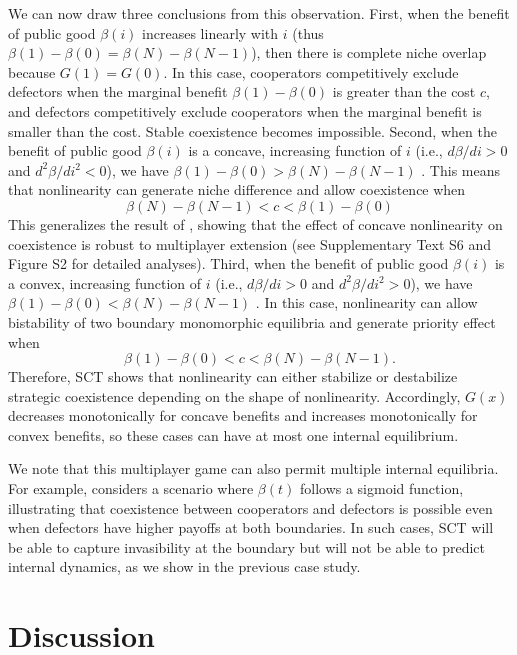 \documentclass[12pt]{article}
\begin{document}
We can now draw three conclusions from this observation.
First, when the benefit of public good $\beta(i)$ increases linearly with $i$ (thus $\beta(1) - \beta(0) = \beta(N) - \beta(N-1)$), then there is complete niche overlap because $G(1) = G(0)$.
In this case, cooperators competitively exclude defectors when the marginal benefit $\beta(1) - \beta(0)$ is greater than the cost $c$, and defectors competitively exclude cooperators when the marginal benefit is smaller than the cost.
Stable coexistence becomes impossible.
Second, when the benefit of public good $\beta(i)$ is a concave, increasing function of $i$ (i.e., $d\beta/di > 0$ and $d^2\beta/di^2 < 0$), we have $\beta(1)-\beta(0) >  \beta(N) - \beta(N-1)$ \citep{motro1991co}.
This means that nonlinearity can generate niche difference and allow coexistence when
\begin{equation}
\beta(N) - \beta(N-1) < c < \beta(1) - \beta(0)
\end{equation}
This generalizes the result of \cite{gore2009snowdrift}, showing that the effect of concave nonlinearity on coexistence is robust to multiplayer extension (see Supplementary Text S6 and Figure S2 for detailed analyses).
Third, when the benefit of public good $\beta(i)$ is a convex, increasing function of $i$ (i.e., $d\beta/di > 0$ and $d^2\beta/di^2 > 0$), we have $\beta(1)-\beta(0) < \beta(N) - \beta(N-1)$ \citep{motro1991co}.
In this case, nonlinearity can allow bistability of two boundary monomorphic equilibria and generate priority effect when
\begin{equation}
\beta(1) - \beta(0) < c < \beta(N) - \beta(N-1).
\end{equation}
Therefore, SCT shows that nonlinearity can either stabilize or destabilize strategic coexistence depending on the shape of nonlinearity.
Accordingly, $G(x)$ decreases monotonically for concave benefits and increases monotonically for convex benefits, so these cases can have at most one internal equilibrium.

We note that this multiplayer game can also permit multiple internal equilibria.
For example, \cite{archetti2012game} considers a scenario where $\beta(t)$ follows a sigmoid function, illustrating that coexistence between cooperators and defectors is possible even when defectors have higher payoffs at both boundaries.
In such cases, SCT will be able to capture invasibility at the boundary but will not be able to predict internal dynamics, as we show in the previous case study.

\section*{Discussion}
\end{document}
